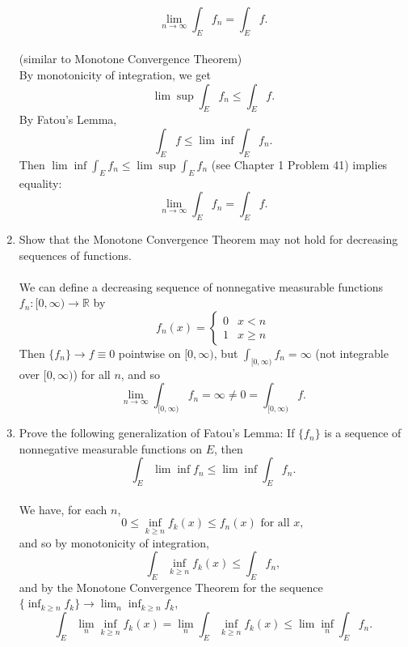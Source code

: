 \begin{enumerate}
    \[
        \lim_{n\to\infty}\int_Ef_n=\int_Ef.
    \]
    \\(similar to Monotone Convergence Theorem)
    \\By monotonicity of integration, we get
    \[
        \lim\sup\int_Ef_n\le \int_Ef.
    \]
    By Fatou's Lemma,
    \[
        \int_Ef\le\lim\inf\int_Ef_n.     
    \]
    Then $\lim\inf\int_Ef_n\le\lim\sup\int_Ef_n$ (see Chapter 1 Problem 41) implies equality:
    \[
        \lim_{n\to\infty}\int_Ef_n=\int_Ef.
    \]
    \item Show that the Monotone Convergence Theorem may not hold for decreasing sequences of functions.\\
    \\We can define a decreasing sequence of nonnegative measurable functions $f_n:[0,\infty)\to\mathbb{R}$ by
    \[
        f_n(x)=
        \begin{cases}
            0&x<n\\
            1&x\ge n
        \end{cases}
    \]
    Then $\{f_n\}\to f\equiv0$ pointwise on $[0,\infty)$, but $\int_{[0,\infty)}f_n=\infty$ (not integrable over $[0,\infty)$) for all $n$, and so
    \[
        \lim_{n\to\infty}\int_{[0,\infty)}f_n=\infty\neq0=\int_{[0,\infty)}f.
    \]
    \item Prove the following generalization of Fatou's Lemma: If $\{f_n\}$ is a sequence of nonnegative measurable functions on $E$, then 
    \[
        \int_E\lim\inf f_n\le\lim\inf\int_Ef_n.     
    \]
    \\We have, for each $n$,
    \[
        0\le\inf_{k\ge n} f_k(x)\le f_n(x)\text{ for all }x,
    \]
    and so by monotonicity of integration,
    \[
    \int_E\inf_{k\ge n} f_k(x)\le\int_Ef_n,
    \]
    and by the Monotone Convergence Theorem for the sequence $\{\inf_{k\ge n} f_k\}\to\lim_n\inf_{k\ge n} f_k$,
    \[
    \int_E\lim_n\inf_{k\ge n} f_k(x)=\lim_n\int_E\inf_{k\ge n} f_k(x)\le\lim\inf_n\int_Ef_n.
    \]
\end{enumerate}
    
